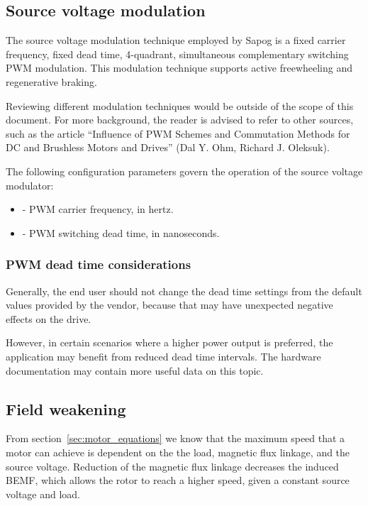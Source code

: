 \documentclass{zubaxdoc}
\begin{document}
\subsection{Source voltage modulation}

The source voltage modulation technique employed by Sapog is a fixed carrier frequency, fixed dead time,
4-quadrant, simultaneous complementary switching PWM modulation.
This modulation technique supports active freewheeling and regenerative braking.

Reviewing different modulation techniques would be outside of the scope of this document.
For more background, the reader is advised to refer to other sources, such as the article
``Influence of PWM Schemes and Commutation Methods for DC and Brushless Motors and Drives''
(Dal Y. Ohm, Richard J. Oleksuk).

The following configuration parameters govern the operation of the source voltage modulator:
\begin{itemize}
\item {} - PWM carrier frequency, in hertz.
\item {} - PWM switching dead time, in nanoseconds.
\end{itemize}

\subsubsection{PWM dead time considerations}

Generally, the end user should not change the dead time settings from the default values provided by
the vendor, because that may have unexpected negative effects on the drive.

However, in certain scenarios where a higher power output is preferred, the application may benefit from
reduced dead time intervals.
The hardware documentation may contain more useful data on this topic.

\subsection{Field weakening}\label{sec:field_weakening}

From section~\ref{sec:motor_equations} we know that the maximum speed that a motor can achieve is dependent
on the the load, magnetic flux linkage, and the source voltage.
Reduction of the magnetic flux linkage decreases the induced BEMF, which allows the rotor to reach a higher speed,
given a constant source voltage and load.
\end{document}
